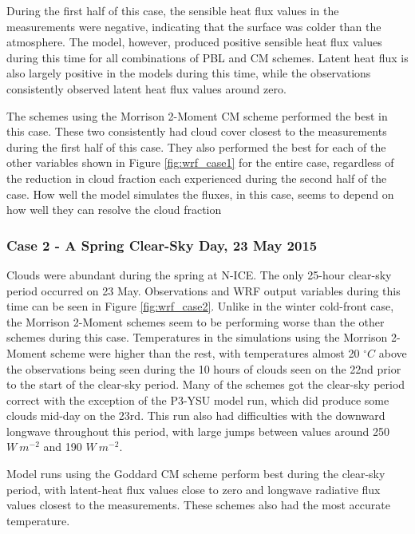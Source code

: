 During the first half of this case, the sensible heat flux values in the measurements were negative, indicating that the surface was colder than the atmosphere. The model, however, produced positive sensible heat flux values during this time for all combinations of PBL and CM schemes. Latent heat flux is also largely positive in the models during this time, while the observations consistently observed latent heat flux values around zero. 

The schemes using the Morrison 2-Moment CM scheme performed the best in this case. These two consistently had cloud cover closest to the measurements during the first half of this case. They also performed the best for each of the other variables shown in Figure \ref{fig:wrf_case1} for the entire case, regardless of the reduction in cloud fraction each experienced during the second half of the case. How well the model simulates the fluxes, in this case, seems to depend on how well they can resolve the cloud fraction

\subsubsection{Case 2 - A Spring Clear-Sky Day, 23 May 2015}

Clouds were abundant during the spring at N-ICE. The only 25-hour clear-sky period occurred on 23 May. Observations and WRF output variables during this time can be seen in Figure \ref{fig:wrf_case2}. Unlike in the winter cold-front case, the Morrison 2-Moment schemes seem to be performing worse than the other schemes during this case. Temperatures in the simulations using the Morrison 2-Moment scheme were higher than the rest, with temperatures almost 20 $^{\circ} C$ above the observations being seen during the 10 hours of clouds seen on the 22nd prior to the start of the clear-sky period. Many of the schemes got the clear-sky period correct with the exception of the P3-YSU model run, which did produce some clouds mid-day on the 23rd. This run also had difficulties with the downward longwave throughout this period, with large jumps between values around 250 $W~m^{-2}$ and 190 $W~m^{-2}$. 

Model runs using the Goddard CM scheme perform best during the clear-sky period, with latent-heat flux values close to zero and longwave radiative flux values closest to the measurements. These schemes also had the most accurate temperature.

